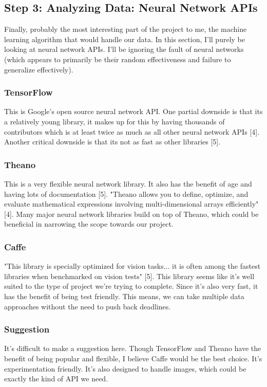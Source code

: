 \documentclass[10pt,journal,compsoc, draftclsnofoot,onecolumn]{IEEEtran}
\begin{document}
\subsection{Step 3: Analyzing Data: Neural Network APIs}
Finally, probably the most interesting part of the project to me, the machine learning algorithm that would handle our data.
In this section, I'll purely be looking at neural network APIs.
I'll be ignoring the fault of neural networks (which appears to primarily be their random effectiveness and failure to generalize effectively). 

\subsubsection{TensorFlow}
This is Google's open source neural network API.
One partial downside is that its a relatively young library, it makes up for this by having thousands of contributors which is at least twice as much as all other neural network APIs [4].
Another critical downside is that its not as fast as other libraries [5].

\subsubsection{Theano}
This is a very flexible neural network library.
It also has the benefit of age and having lots of documentation [5].
"Theano allows you to define, optimize, and evaluate mathematical expressions involving multi-dimensional arrays efficiently" [4].
Many major neural network libraries build on top of Theano, which could be beneficial in narrowing the scope towards our project.

\subsubsection{Caffe}
"This library is specially optimized for vision tasks... it is often among the fastest libraries when benchmarked on vision tests" [5].
This library seems like it's well suited to the type of project we're trying to complete.
Since it's also very fast, it has the benefit of being test friendly.
This means, we can take multiple data approaches without the need to push back deadlines.

\subsubsection{Suggestion}
It's difficult to make a suggestion here.
Though TensorFlow and Theano have the benefit of being popular and flexible, I believe Caffe would be the best choice.
It's experimentation friendly. It's also designed to handle images, which could be exactly the kind of API we need.
\end{document}
